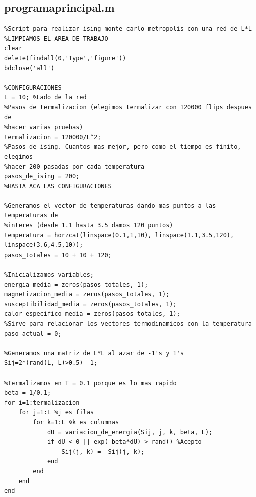\documentclass[twocolumn,Spanish,a4paper,11pt]{article}
\begin{document}
\subsection{programaprincipal.m}
\begin{lstlisting}
%Script para realizar ising monte carlo metropolis con una red de L*L
%LIMPIAMOS EL AREA DE TRABAJO
clear
delete(findall(0,'Type','figure'))
bdclose('all')

%CONFIGURACIONES
L = 10; %Lado de la red
%Pasos de termalizacion (elegimos termalizar con 120000 flips despues de
%hacer varias pruebas)
termalizacion = 120000/L^2; 
%Pasos de ising. Cuantos mas mejor, pero como el tiempo es finito, elegimos
%hacer 200 pasadas por cada temperatura
pasos_de_ising = 200; 
%HASTA ACA LAS CONFIGURACIONES

%Generamos el vector de temperaturas dando mas puntos a las temperaturas de
%interes (desde 1.1 hasta 3.5 damos 120 puntos)
temperatura = horzcat(linspace(0.1,1,10), linspace(1.1,3.5,120), linspace(3.6,4.5,10));
pasos_totales = 10 + 10 + 120;

%Inicializamos variables;
energia_media = zeros(pasos_totales, 1);
magnetizacion_media = zeros(pasos_totales, 1);
susceptibilidad_media = zeros(pasos_totales, 1);
calor_especifico_media = zeros(pasos_totales, 1);
%Sirve para relacionar los vectores termodinamicos con la temperatura
paso_actual = 0; 

%Generamos una matriz de L*L al azar de -1's y 1's
Sij=2*(rand(L, L)>0.5) -1; 

%Termalizamos en T = 0.1 porque es lo mas rapido
beta = 1/0.1;
for i=1:termalizacion
    for j=1:L %j es filas
        for k=1:L %k es columnas
            dU = variacion_de_energia(Sij, j, k, beta, L);
            if dU < 0 || exp(-beta*dU) > rand() %Acepto
                Sij(j, k) = -Sij(j, k);
            end
        end
    end
end


\end{lstlisting}
\end{document}
